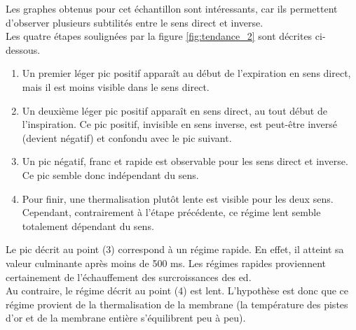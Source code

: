 Les graphes obtenus pour cet échantillon sont intéressants, car ils permettent d'observer plusieurs subtilités entre le sens direct et inverse. \\
Les quatre étapes soulignées par la figure \ref{fig:tendance_2} sont décrites ci-dessous. 
\begin{enumerate}
    \item Un premier léger pic positif apparaît au début de l'expiration en sens direct, mais il est moins visible dans le sens direct.\\
    \item Un deuxième léger pic positif apparaît en sens direct, au tout début de l'inspiration. Ce pic positif, invisible en sens inverse, est
          peut-être inversé (devient négatif) et confondu avec le pic suivant. \\
    \item Un pic négatif, franc et rapide est observable pour les sens direct et inverse. Ce pic semble donc indépendant du sens. \\
    \item Pour finir, une thermalisation plutôt lente est visible pour les deux sens. Cependant, contrairement à l'étape précédente, ce régime
          lent semble totalement dépendant du sens. 
\end{enumerate}
Le pic décrit au point (3) correspond à un régime rapide. En effet, il atteint sa valeur culminante après moins de 500 ms. Les régimes 
rapides proviennent certainement de l'échauffement des surcroissances des \gls{ed}. \\

Au contraire, le régime décrit au point (4) est lent. L'hypothèse est donc que ce régime provient de la thermalisation de la membrane (la 
température des pistes d'or et de la membrane entière s'équilibrent peu à peu). \\


